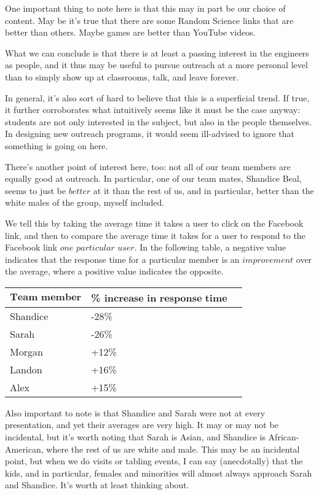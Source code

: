 \documentclass[11pt,a4paper]{article}
\begin{document}
One important thing to note here is that this may in part be our choice of content. May be it's true that there are some Random Science links that are better than others. Maybe games are better than YouTube videos.

What we can conclude is that there is at least a passing interest in the engineers as people, and it thus may be useful to pursue outreach at a more personal level than to simply show up at classrooms, talk, and leave forever.

In general, it's also sort of hard to believe that this is a superficial trend. If true, it further corroborates what intuitively seems like it must be the case anyway: students are not only interested in the subject, but also in the people themselves. In designing new outreach programs, it would seem ill-advised to ignore that something is going on here.

There's another point of interest here, too: not all of our team members are equally good at outreach. In particular, one of our team mates, Shandice Beal, seems to just be $\textit{better}$ at it than the rest of us, and in particular, better than the white males of the group, myself included.

We tell this by taking the average time it takes a user to click on the Facebook link, and then to compare the average time it takes for a user to respond to the Facebook link $\textit{one particular user}$. In the following table, a negative value indicates that the response time for a particular member is an $\textit{improvement}$ over the average, where a positive value indicates the opposite.

\begin{center}
\begin{tabular}{l | l c }
   $\textbf{Team member}$ & \% $\textbf{increase in response time}$ \\
   \hline
   Shandice & -28\% \\
   Sarah & -26\% \\
   Morgan & +12\% \\
   Landon & +16\% \\
   Alex & +15\% \\
\end{tabular}
\end{center}

Also important to note is that Shandice and Sarah were not at every presentation, and yet their averages are very high. It may or may not be incidental, but it's worth noting that Sarah is Asian, and Shandice is African-American, where the rest of us are white and male. This may be an incidental point, but when we do visits or tabling events, I can say (anecdotally) that the kids, and in particular, females and minorities will almost always approach Sarah and Shandice. It's worth at least thinking about.
\end{document}
